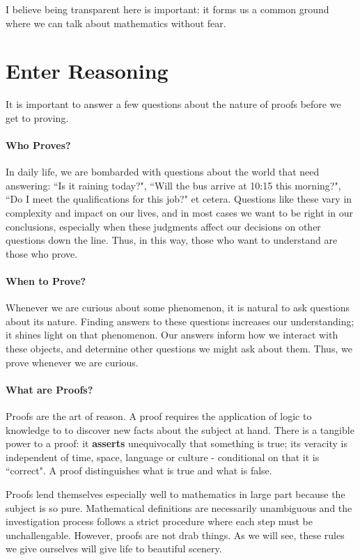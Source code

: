 \documentclass[../proofs.tex]{subfiles}
\begin{document}
I believe being transparent here is important: it forms us a common ground where we can talk about
mathematics without fear.


\section{Enter Reasoning}
It is important to answer a few questions about the nature of proofs before we
get to proving.

\paragraph{Who Proves?} In daily life, we are bombarded with questions
about the world that need answering: ``Is it raining today?", ``Will the bus
arrive at 10:15 this morning?", ``Do I meet the qualifications for this job?"
et cetera. Questions like these vary in complexity and impact on our lives,
and in most cases we want to be right in our conclusions, especially when these
judgments affect our decisions on other questions down the line. Thus, in this
way, those who want to understand are those who prove.

\paragraph{When to Prove?} Whenever we are curious about some phenomenon,
it is natural to ask questions about its nature. Finding answers to these
questions increases our understanding; it shines light on that phenomenon.
Our answers inform how we interact with these objects, and determine other
questions we might ask about them. Thus, we prove whenever we are curious.

\paragraph{What are Proofs?} Proofs are the art of reason. A proof
requires the application of logic to knowledge to to discover new facts about
the subject at hand. There is a tangible power to a proof: it \textbf{asserts}
unequivocally that something is true; its veracity is independent of time,
space, language or culture - conditional on that it is ``correct". A
proof distinguishes what is true and what is false.


Proofs lend themselves especially well to mathematics in large part because the
subject is so pure. Mathematical definitions are necessarily unambiguous and the
investigation process follows a strict procedure where each step must be
unchallengable. However, proofs are not drab things. As we will see, these
rules we give ourselves will give life to beautiful scenery.
\end{document}
